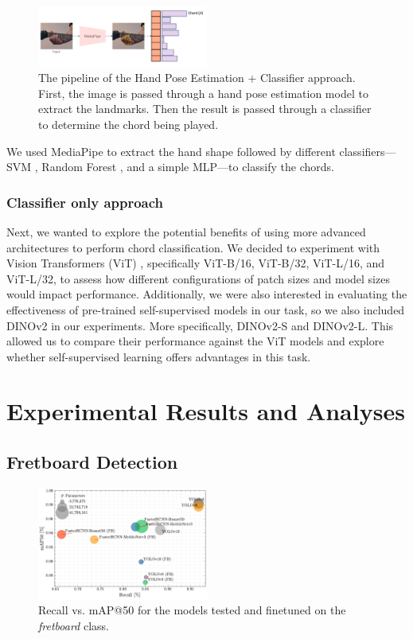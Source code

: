 \documentclass[10pt,twocolumn,letterpaper]{article}
\begin{document}
\begin{figure}[h]
    \centering
    \includegraphics[width=0.5\textwidth]{images/final/hand_pose_estimation_classifier.png}
    \caption{The pipeline of the Hand Pose Estimation + Classifier approach. First, the image is passed through a hand pose estimation model to extract the landmarks. Then the result is passed through a classifier to determine the chord being played.}
    \label{fig:hand-pose-estimation-classifier}
\end{figure}

We used MediaPipe to extract the hand shape followed by different classifiers—SVM \cite{cortes1995support}, Random Forest \cite{ho1995random}, and a simple MLP—to classify the chords.

\subsubsection{Classifier only approach}
Next, we wanted to explore the potential benefits of using more advanced architectures to perform chord classification. We decided to experiment with Vision Transformers (ViT) \cite{dosovitskiy2020image}, specifically ViT-B/16, ViT-B/32, ViT-L/16, and ViT-L/32, to assess how different configurations of patch sizes and model sizes would impact performance. Additionally, we were also interested in evaluating the effectiveness of pre-trained self-supervised models in our task, so we also included DINOv2 \cite{oquab2023dinov2} in our experiments. More specifically, DINOv2-S and DINOv2-L. This allowed us to compare their performance against the ViT models and explore whether self-supervised learning offers advantages in this task.

\section{Experimental Results and Analyses}
\label{sec:results}

\subsection{Fretboard Detection}


\begin{figure}[h]
    \centering
    \includegraphics[width=0.5\textwidth]{images/final/recall_vs_map50.pdf}
    \caption{Recall vs. mAP@50 for the models tested and finetuned on the \emph{fretboard} class.}
    \label{fig:fretboard-models-recall-map}
\end{figure}
\end{document}
